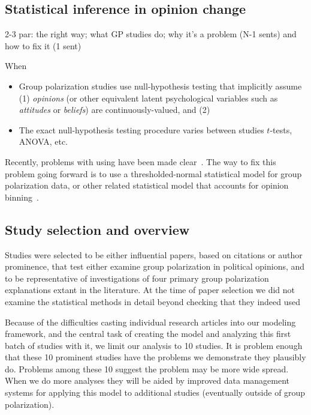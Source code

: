 \documentclass[11pt, letterpaper]{article}
\begin{document}
% 

\subsection{Statistical inference in opinion change}

2-3 par: the right way; what GP studies do; why it's a problem (N-1 sents) and how
to fix it (1 sent)

When 

\begin{itemize}
  \item 
    Group polarization studies use null-hypothesis testing that implicitly
    assume (1) \emph{opinions} (or other equivalent latent psychological variables
    such as \emph{attitudes} or \emph{beliefs}) are continuously-valued, and
    (2) 
  \item
    The exact null-hypothesis testing procedure varies between studies $t$-tests, ANOVA, etc. 
\end{itemize}

Recently, problems with using have been made clear~\cite{Liddell2018}.
The way to fix this problem going forward is to use a thresholded-normal 
statistical model for group polarization data, or other related statistical 
model that accounts for opinion binning~\cite[Ch. 23]{Liddell2018,KruschkeDBDA}.

\subsection{Study selection and overview}

Studies were selected to be either influential papers, based on citations or
author prominence, that test either examine
group polarization in political opinions, and to be representative of investigations
of four primary group polarization explanations extant in the literature.
At the time of paper selection we did not examine the statistical methods in detail beyond
checking that they indeed used 

Because of the difficulties casting individual research articles into our modeling
framework, and the central task of creating the model and analyzing this first
batch of studies with it, we limit our analysis to 10 studies. It is problem
enough that these 10 prominent studies have the problems we demonstrate they
plausibly do. Problems among these 10 suggest the problem may be more wide spread. 
When we do more analyses
they will be aided by improved data management systems for applying this model to 
additional studies (eventually outside of group polarization).
\end{document}
